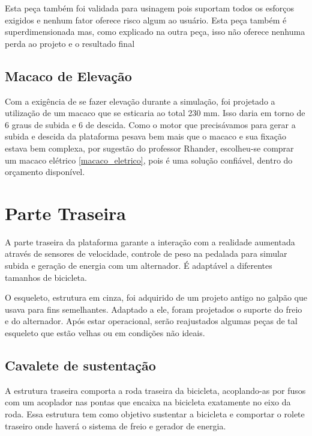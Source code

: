     Esta peça também foi validada para usinagem pois suportam todos os esforços exigidos e nenhum fator oferece risco algum ao usuário. Esta peça também é superdimensionada mas, como explicado na outra peça, isso não oferece nenhuma perda ao projeto e o resultado final

\subsection{Macaco de Elevação}

    Com a exigência de se fazer elevação durante a simulação, foi projetado a utilização de um macaco que se esticaria ao total 230 mm. Isso daria em torno de 6 graus de subida e 6 de descida. Como o motor que precisávamos para gerar a subida e descida da plataforma pesava bem mais que o macaco e sua fixação estava bem complexa, por sugestão do professor Rhander, escolheu-se comprar um macaco elétrico \ref{macaco_eletrico}, pois é uma solução confiável, dentro do orçamento disponível.


\section{Parte Traseira}
    A parte traseira da plataforma garante a interação com a realidade aumentada através de sensores de velocidade, controle de peso na pedalada para simular subida e geração de energia com um alternador. É adaptável a diferentes tamanhos de bicicleta.


    O esqueleto, estrutura em cinza, foi adquirido de um projeto antigo no galpão que usava para fins semelhantes. Adaptado a ele, foram projetados o suporte do freio e do alternador. Após estar operacional, serão reajustados algumas peças de tal esqueleto que estão velhas ou em condições não ideais.

\subsection{Cavalete de sustentação}

    A estrutura traseira comporta a roda traseira da bicicleta, acoplando-as por fusos com um acoplador nas pontas que encaixa na bicicleta exatamente no eixo da roda. Essa estrutura tem como objetivo sustentar a bicicleta e comportar o rolete traseiro onde haverá o sistema de freio e gerador de energia.

